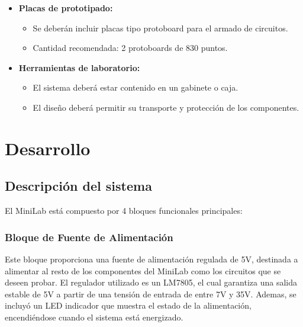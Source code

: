 \documentclass[12pt,a4paper]{article}
\begin{document}
\begin{itemize}
\begin{itemize}
\begin{itemize}
                    \item Red eléctrica (220V).
                    \item Batería de 9V (fuente auxiliar).
                \end{itemize}
        \end{itemize}
    \item \textbf{Placas de prototipado:}
        \begin{itemize}
            \item Se deberán incluir placas tipo protoboard para el armado de circuitos.
            \item Cantidad recomendada: 2 protoboards de 830 puntos.
        \end{itemize}
    \item \textbf{Herramientas de laboratorio:}
        \begin{itemize}
            \item El sistema deberá estar contenido en un gabinete o caja.
            \item El diseño deberá permitir su transporte y protección de los componentes.
        \end{itemize}
\end{itemize}

\section{Desarrollo}

\subsection{Descripción del sistema}

El MiniLab está compuesto por 4 bloques funcionales principales:

\subsubsection{Bloque de Fuente de Alimentación}
Este bloque proporciona una fuente de alimentación regulada de 5V, destinada a alimentar al resto de los
componentes del MiniLab como los circuitos que se deseen probar.
El regulador utilizado es un LM7805, el cual garantiza una salida estable de 5V a partir de una tensión de entrada de entre 7V y 35V.
Ademas, se incluyó un LED indicador que muestra el estado de la alimentación, encendiéndose cuando el sistema está energizado.
\end{document}
